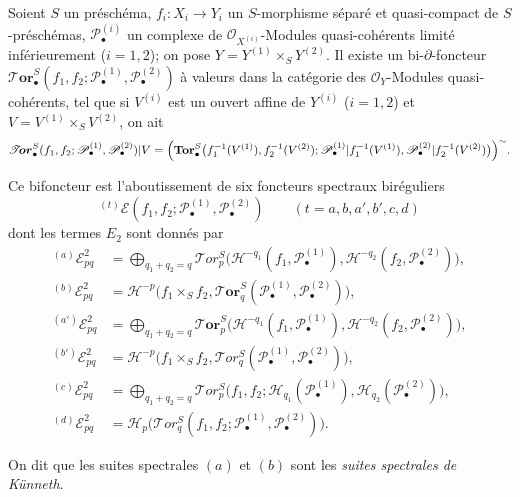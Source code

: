 \begin{theorem}[6.7.3]
Soient $S$ un préschéma, $f_i:X_i\to Y_i$ un $S$-morphisme séparé et
quasi-compact de $S$-préschémas, $\mathscr P_\bullet^{(i)}$ un complexe de
$\mathscr O_{X^{(i)}}$-Modules quasi-cohérents limité inférieurement
($i=1,2$); on pose $Y=Y^{(1)}\times_S Y^{(2)}$. Il existe un
bi-$\partial$-foncteur
  $\boldsymbol{\mathscr{T}\!or}_\bullet^S
(f_1,f_2;\mathscr P_\bullet^{(1)},\mathscr P_\bullet^{(2)})$
à valeurs dans la catégorie des $\mathscr O_Y$-Modules quasi-cohérents, tel
que si $V^{(i)}$ est un ouvert affine de $Y^{(i)}$ ($i=1,2$) et
$V=V^{(1)}\times_S V^{(2)}$, on ait
\[
  \boldsymbol{\mathscr{T}\!or}_\bullet^S
  (f_1,f_2;\mathscr P_\bullet^{(1)},\mathscr P_\bullet^{(2)})|V
  =\Bigl(\mathbf{Tor}_\bullet^S
    \bigl(f_1^{-1}(V^{(1)}),f_2^{-1}(V^{(2)});
      \mathscr P_\bullet^{(1)}|f_1^{-1}(V^{(1)}),
      \mathscr P_\bullet^{(2)}|f_2^{-1}(V^{(2)})\bigr)\Bigr)^{\sim}.
\]

Ce bifoncteur est l'aboutissement de six foncteurs spectraux biréguliers
\[
  {}^{(t)}\mathscr E
  (f_1,f_2;\mathscr P_\bullet^{(1)},\mathscr P_\bullet^{(2)})
  \qquad(t=a,b,a',b',c,d)
\]
dont les termes $E_2$ sont donnés par
\[
\begin{aligned}
  {}^{(a)}\mathscr E_{pq}^2
  &=\bigoplus_{q_1+q_2=q}
    \mathscr{T}\!or_p^S
    \bigl(\mathcal H^{-q_1}(f_1,\mathscr P_\bullet^{(1)}),
          \mathcal H^{-q_2}(f_2,\mathscr P_\bullet^{(2)})\bigr),\\
  {}^{(b)}\mathscr E_{pq}^2
  &=\mathscr H^{-p}\bigl(f_1\times_S f_2,
    \boldsymbol{\mathscr{T}\!or}_q^S
    (\mathscr P_\bullet^{(1)},\mathscr P_\bullet^{(2)})\bigr),\\
  {}^{(a')}\mathscr E_{pq}^2
  &=\bigoplus_{q_1+q_2=q}
    \boldsymbol{\mathscr{T}\!or}_p^S
    \bigl(\mathscr H^{-q_1}(f_1,\mathscr P_\bullet^{(1)}),
          \mathscr H^{-q_2}(f_2,\mathscr P_\bullet^{(2)})\bigr),\\
  {}^{(b')}\mathscr E_{pq}^2
  &=\mathcal H^{-p}\bigl(f_1\times_S f_2,
    \mathscr{T}\!or_q^S
    (\mathscr P_\bullet^{(1)},\mathscr P_\bullet^{(2)})\bigr),\\
  {}^{(c)}\mathscr E_{pq}^2
  &=\bigoplus_{q_1+q_2=q}
    \mathscr{T}\!or_p^S
    \bigl(f_1,f_2;
      \mathscr H_{q_1}(\mathscr P_\bullet^{(1)}),
      \mathscr H_{q_2}(\mathscr P_\bullet^{(2)})\bigr),\\
  {}^{(d)}\mathscr E_{pq}^2
  &=\mathscr H_p\bigl(\mathscr{T}\!or_q^S
    (f_1,f_2;\mathscr P_\bullet^{(1)},\mathscr P_\bullet^{(2)})\bigr).
\end{aligned}
\]
\end{theorem}
\noindent On dit que les suites spectrales $(a)$ et $(b)$ sont les \emph{suites
spectrales de Künneth}.

